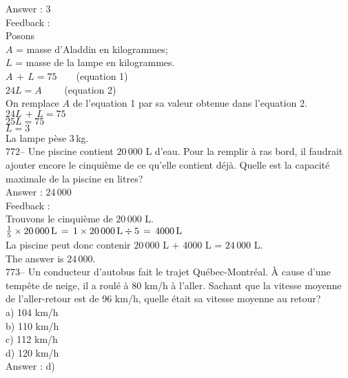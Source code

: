 ﻿\documentclass[letterpaper, 12pt]{article}
\begin{document}
Answer : 3\\

Feedback :\\
Posons\\
$A$ = masse d'Aladdin en kilogrammes; \\
$L$ = masse de la lampe en kilogrammes.\\

$A\,+\,L=75 \qquad $(equation 1)\\
$24L=A \qquad $ (equation 2)\\

On remplace $A$ de l'equation 1 par sa valeur obtenue dans l'equation
2.\\
$24L \,+\,L = 75$\\
$25L=75$\\
$L=3$\\
La lampe p\`ese 3\,kg.\\

772-- Une piscine contient $20\,000$ L d'eau.  Pour la remplir \`a ras bord,
il faudrait ajouter encore le cinqui\`eme de ce qu'elle contient d\'ej\`a.
Quelle est la capacit\'e maximale de la piscine en litres?\\

Answer : $24\,000$ \\

Feedback : \\
Trouvons le cinqui\`eme de $20\,000$ L.\\
$\frac{1}{5}\times 20\,000
\textrm{\,L}\,=\,1\times20\,000\,\textrm{L}\div5\,=\,4000\,\textrm{L}$\\
La piscine peut donc contenir $20\,000$ L + 4000 L = $24\,000$ L.\\
The answer is $24\,000$.\\

773-- Un conducteur d'autobus fait le trajet Qu\'ebec-Montr\'eal.  \`A cause
d'une temp\^ete de neige, il a roul\'e \`a 80 km/h \`a l'aller.  Sachant que
la vitesse moyenne de l'aller-retour est de 96 km/h, quelle \'etait sa
vitesse moyenne au retour?\\
a) 104 km/h\\
b) 110 km/h\\
c) 112 km/h\\
d) 120 km/h\\

Answer : d)\\
\end{document}
